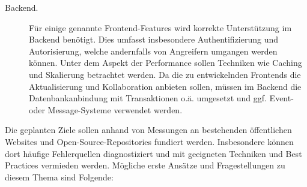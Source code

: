 \begin{description}
    \item[Backend.] Für einige genannte Frontend-Features wird korrekte Unterstützung im Backend benötigt.
    Dies umfasst insbesondere Authentifizierung und Autorisierung, welche andernfalls von Angreifern umgangen werden können.
    Unter dem Aspekt der Performance sollen Techniken wie Caching und Skalierung betrachtet werden.
    Da die zu entwickelnden Frontends die Aktualisierung und Kollaboration anbieten sollen, müssen im Backend die Datenbankanbindung mit Transaktionen o.ä. umgesetzt und ggf. Event- oder Message-Systeme verwendet werden.
\end{description}

Die geplanten Ziele sollen anhand von Messungen an bestehenden öffentlichen Websites und Open-Source-Repositories fundiert werden.
Insbesondere können dort häufige Fehlerquellen diagnostiziert und mit geeigneten Techniken und Best Practices vermieden werden.
Mögliche erste Ansätze und Fragestellungen zu diesem Thema sind Folgende:

